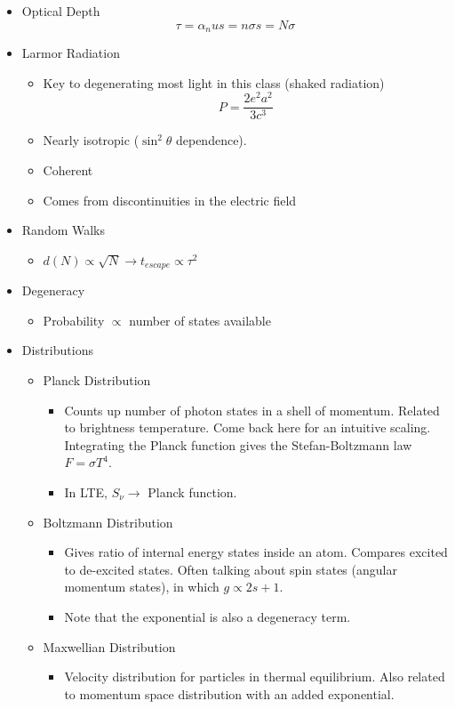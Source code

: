 \documentclass{article}
\begin{document}
\begin{itemize}
    \item Optical Depth
    $$
    \tau = \alpha_nu s = n \sigma s = N \sigma
    $$
    \item Larmor Radiation
    \begin{itemize}
        \item Key to degenerating most light in this class (shaked radiation)
        $$
        P = \frac{2e^2 a^2}{3c^3}
        $$
        \item Nearly isotropic ($\sin^2\theta$ dependence).
        \item Coherent
        \item Comes from discontinuities in the electric field
    \end{itemize}
    \item Random Walks
    \begin{itemize}
        \item $d(N) \propto \sqrt{N} \rightarrow t_{escape} \propto \tau^2$
    \end{itemize}
    \item Degeneracy
    \begin{itemize}
        \item Probability $\propto$ number of states available
    \end{itemize}
    \item Distributions
    \begin{itemize}
        \item Planck Distribution 
        \begin{itemize}
            \item Counts up number of photon states in a shell of momentum. Related to brightness temperature. Come back here for an intuitive scaling. Integrating the Planck function gives the Stefan-Boltzmann law $F = \sigma T^4$.
        \end{itemize}
        \begin{itemize}
            \item In LTE, $S_\nu \to$ Planck function.
        \end{itemize}
        \item Boltzmann Distribution
        \begin{itemize}
            \item Gives ratio of internal energy states inside an atom. Compares excited to de-excited states. Often talking about spin states (angular momentum states), in which $g \propto 2s+1$.
            \item Note that the exponential is also a degeneracy term.
        \end{itemize}
        \item Maxwellian Distribution
        \begin{itemize}
            \item Velocity distribution for particles in thermal equilibrium. Also related to momentum space distribution with an added exponential. 
        \end{itemize}
    \end{itemize}
    

\end{itemize}
\end{document}
